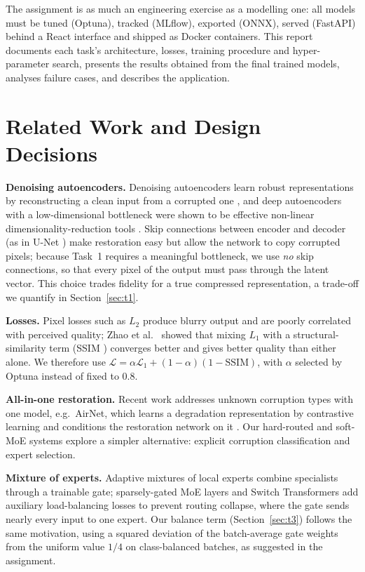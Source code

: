 \documentclass[conference]{IEEEtran}
\begin{document}
The assignment is as much an engineering exercise as a modelling one: all models must be tuned (Optuna), tracked (MLflow), exported (ONNX), served (FastAPI) behind a React interface and shipped as Docker containers. This report documents each task's architecture, losses, training procedure and hyper-parameter search, presents the results obtained from the final trained models, analyses failure cases, and describes the application.

\section{Related Work and Design Decisions}
\textbf{Denoising autoencoders.} Denoising autoencoders learn robust representations by reconstructing a clean input from a corrupted one \cite{vincent2008dae}, and deep autoencoders with a low-dimensional bottleneck were shown to be effective non-linear dimensionality-reduction tools \cite{hinton2006reducing}. Skip connections between encoder and decoder (as in U-Net \cite{ronneberger2015unet}) make restoration easy but allow the network to copy corrupted pixels; because Task~1 requires a meaningful bottleneck, we use \emph{no} skip connections, so that every pixel of the output must pass through the latent vector. This choice trades fidelity for a true compressed representation, a trade-off we quantify in Section~\ref{sec:t1}.

\textbf{Losses.} Pixel losses such as $L_2$ produce blurry output and are poorly correlated with perceived quality; Zhao et al.\ \cite{zhao2017loss} showed that mixing $L_1$ with a structural-similarity term (SSIM \cite{wang2004ssim}) converges better and gives better quality than either alone. We therefore use $\mathcal{L}=\alpha\mathcal{L}_{1}+(1-\alpha)(1-\mathrm{SSIM})$, with $\alpha$ selected by Optuna instead of fixed to 0.8.

\textbf{All-in-one restoration.} Recent work addresses unknown corruption types with one model, e.g.\ AirNet, which learns a degradation representation by contrastive learning and conditions the restoration network on it \cite{li2022airnet}. Our hard-routed and soft-MoE systems explore a simpler alternative: explicit corruption classification and expert selection.

\textbf{Mixture of experts.} Adaptive mixtures of local experts \cite{jacobs1991moe} combine specialists through a trainable gate; sparsely-gated MoE layers \cite{shazeer2017moe} and Switch Transformers \cite{fedus2022switch} add auxiliary load-balancing losses to prevent routing collapse, where the gate sends nearly every input to one expert. Our balance term (Section~\ref{sec:t3}) follows the same motivation, using a squared deviation of the batch-average gate weights from the uniform value $1/4$ on class-balanced batches, as suggested in the assignment.
\end{document}
